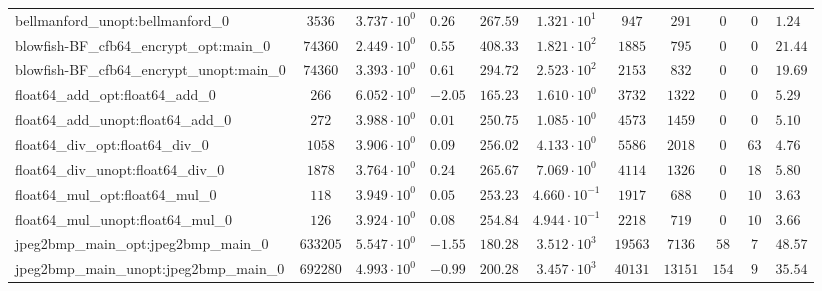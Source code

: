 \begin{tabular}{|l|c|HHc|c|c|c|c|cH|}
bellmanford\_unopt:bellmanford\_0               & $ 3536     $ & $ 3.737 \cdot 10^{0} $ & $ 0.26  $ & $ 267.59 $ & $ 1.321 \cdot 10^{1}  $ & $ 947    $ & $ 291   $ & $ 0   $ & $ 0   $ & $ 1.24    $ \\
blowfish-BF\_cfb64\_encrypt\_opt:main\_0        & $ 74360    $ & $ 2.449 \cdot 10^{0} $ & $ 0.55  $ & $ 408.33 $ & $ 1.821 \cdot 10^{2}  $ & $ 1885   $ & $ 795   $ & $ 0   $ & $ 0   $ & $ 21.44   $ \\
blowfish-BF\_cfb64\_encrypt\_unopt:main\_0      & $ 74360    $ & $ 3.393 \cdot 10^{0} $ & $ 0.61  $ & $ 294.72 $ & $ 2.523 \cdot 10^{2}  $ & $ 2153   $ & $ 832   $ & $ 0   $ & $ 0   $ & $ 19.69   $ \\
float64\_add\_opt:float64\_add\_0               & $ 266      $ & $ 6.052 \cdot 10^{0} $ & $ -2.05 $ & $ 165.23 $ & $ 1.610 \cdot 10^{0}  $ & $ 3732   $ & $ 1322  $ & $ 0   $ & $ 0   $ & $ 5.29    $ \\
float64\_add\_unopt:float64\_add\_0             & $ 272      $ & $ 3.988 \cdot 10^{0} $ & $ 0.01  $ & $ 250.75 $ & $ 1.085 \cdot 10^{0}  $ & $ 4573   $ & $ 1459  $ & $ 0   $ & $ 0   $ & $ 5.10    $ \\
float64\_div\_opt:float64\_div\_0               & $ 1058     $ & $ 3.906 \cdot 10^{0} $ & $ 0.09  $ & $ 256.02 $ & $ 4.133 \cdot 10^{0}  $ & $ 5586   $ & $ 2018  $ & $ 0   $ & $ 63  $ & $ 4.76    $ \\
float64\_div\_unopt:float64\_div\_0             & $ 1878     $ & $ 3.764 \cdot 10^{0} $ & $ 0.24  $ & $ 265.67 $ & $ 7.069 \cdot 10^{0}  $ & $ 4114   $ & $ 1326  $ & $ 0   $ & $ 18  $ & $ 5.80    $ \\
float64\_mul\_opt:float64\_mul\_0               & $ 118      $ & $ 3.949 \cdot 10^{0} $ & $ 0.05  $ & $ 253.23 $ & $ 4.660 \cdot 10^{-1} $ & $ 1917   $ & $ 688   $ & $ 0   $ & $ 10  $ & $ 3.63    $ \\
float64\_mul\_unopt:float64\_mul\_0             & $ 126      $ & $ 3.924 \cdot 10^{0} $ & $ 0.08  $ & $ 254.84 $ & $ 4.944 \cdot 10^{-1} $ & $ 2218   $ & $ 719   $ & $ 0   $ & $ 10  $ & $ 3.66    $ \\
jpeg2bmp\_main\_opt:jpeg2bmp\_main\_0           & $ 633205   $ & $ 5.547 \cdot 10^{0} $ & $ -1.55 $ & $ 180.28 $ & $ 3.512 \cdot 10^{3}  $ & $ 19563  $ & $ 7136  $ & $ 58  $ & $ 7   $ & $ 48.57   $ \\
jpeg2bmp\_main\_unopt:jpeg2bmp\_main\_0         & $ 692280   $ & $ 4.993 \cdot 10^{0} $ & $ -0.99 $ & $ 200.28 $ & $ 3.457 \cdot 10^{3}  $ & $ 40131  $ & $ 13151 $ & $ 154 $ & $ 9   $ & $ 35.54   $ \\

\end{tabular}
